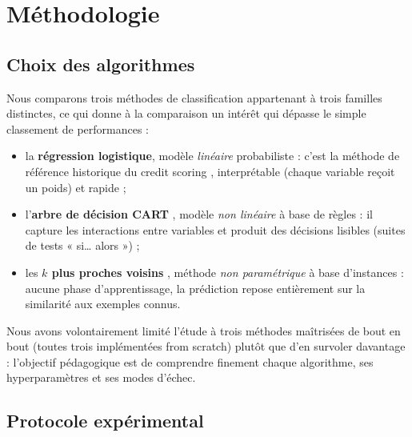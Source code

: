 
\section{Méthodologie}
\label{sec:methodologie}

\subsection{Choix des algorithmes}

Nous comparons trois méthodes de classification appartenant à trois familles
distinctes, ce qui donne à la comparaison un intérêt qui dépasse le simple
classement de performances :

\begin{itemize}
  \item la \textbf{régression logistique}, modèle \emph{linéaire}
    probabiliste : c'est la méthode de référence historique du credit scoring
    \cite{hosmer2000logistic}, interprétable (chaque variable reçoit un poids)
    et rapide ;
  \item l'\textbf{arbre de décision CART} \cite{breiman1984cart}, modèle
    \emph{non linéaire} à base de règles : il capture les interactions entre
    variables et produit des décisions lisibles (suites de tests
    « si\ldots{} alors ») ;
  \item les \textbf{$k$ plus proches voisins} \cite{cover1967knn}, méthode
    \emph{non paramétrique} à base d'instances : aucune phase d'apprentissage,
    la prédiction repose entièrement sur la similarité aux exemples connus.
\end{itemize}

Nous avons volontairement limité l'étude à trois méthodes maîtrisées de bout en
bout (toutes trois implémentées from scratch) plutôt que d'en survoler
davantage : l'objectif pédagogique est de comprendre finement chaque algorithme,
ses hyperparamètres et ses modes d'échec.

\subsection{Protocole expérimental}

